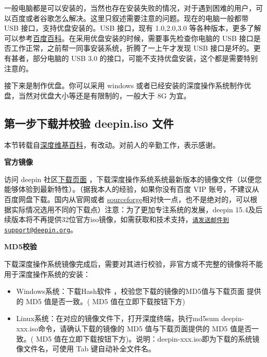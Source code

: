 \documentclass[doctor,openright,twoside]{sjtuthesis}
\providecommand{\tightlist}{%
    \setlength{\itemsep}{0pt}\setlength{\parskip}{0pt}}
\theoremstyle{plain}
\theoremstyle{definition}
\theoremstyle{remark}
\theoremstyle{ocrenumbox}
\theoremstyle{plain}
\begin{document}
一般电脑都是可以安装的，当然也存在安装失败的情况，对于遇到困难的用户，可以百度或者谷歌怎么解决。这里只叙述需要注意的问题。现在的电脑一般都带
USB 接口，支持优盘安装的。USB 接口，现有 1.0,2.0,3.0
等各种版本，更多了解可以参考\href{https://baike.baidu.com/item/USB\%E6\%8E\%A5\%E5\%8F\%A3/493294?fr=aladdin}{百度百科}。在采用优盘安装的时候，需要事先检查你电脑的
USB 接口是否工作正常，之前帮一同事安装系统，折腾了一上午才发现 USB
接口是坏的。更有甚者，部分电脑的 USB 3.0
的接口，可能不支持优盘安装，这个都是需要特别注意的。

接下来是制作优盘。你可以采用 windows
或者已经安装的深度操作系统制作优盘，当然对优盘大小等还是有限制的，一般大于
8G 为宜。

\hypertarget{-deepin.iso-}{%
\subsection{第一步下载并校验 deepin.iso 文件}\label{-deepin.iso-}}

本节转载自\href{https://wiki.deepin.org/index.php?title=\%E5\%8E\%9F\%E7\%94\%9F\%E5\%AE\%89\%E8\%A3\%85}{深度维基百科}，有改动。对前人的辛勤工作，表示感谢。

\textbf{官方镜像}

访问 deepin 社区\href{https://www.deepin.org/download/}{下载页面}
，下载深度操作系统系统最新版本的镜像文件（以便您能够体验到最新特性）。（据我本人的经验，如果你没有百度
VIP 账号，不建议从百度网盘下载。国内从官网或者
\href{https://sourceforge.net/projects/deepin/}{sourceforge}相对快一点，也不是绝对的，可以根据实际情况选用不同的下载点）注意：为了更加专注系统的发展，deepin
15.4及后续版本将不再提供32位官方iso镜像，如需获取和技术支持，\href{mailto:请发送邮件到support@deepin.org}{\nolinkurl{请发送邮件到support@deepin.org}}。

\textbf{MD5校验}

下载深度操作系统镜像完成后，需要对其进行校验，非官方或不完整的镜像将不能用于深度操作系统的安装：

\begin{itemize}
\tightlist
\item
  Windows系统：下载Hash软件 ，校验您下载的镜像的MD5值与下载页面 提供的
  MD5 值是否一致。( MD5 值在立即下载按钮下方)
\item
  Linux系统：在对应的镜像文件下，打开深度终端，执行md5sum
  deepin-xxx.iso命令，请确认下载的镜像的 MD5 值与下载页面提供的 MD5
  值是否一致。( MD5
  值在立即下载按钮下方)。说明：deepin-xxx.iso即为下载的系统镜像文件名，可使用
  Tab 键自动补全文件名。
\end{itemize}
\end{document}
